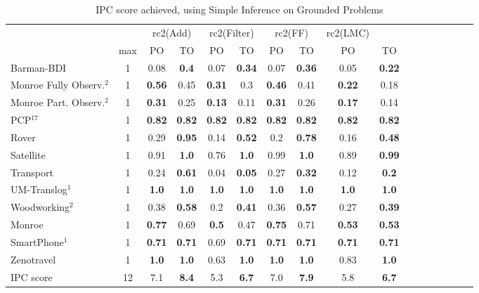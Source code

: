 \documentclass[letterpaper]{article} %
\begin{document}
\begin{table}
	\centering
	\caption{IPC score achieved, using Simple Inference on Grounded Problems}
	\label{table:GroundedSimpleIPC}
	\scalebox{0.85} {
		\begin{tabular}{lccccccccccccccccl} 
			\toprule 
			&& \multicolumn{2}{c}{rc2(Add)} & \multicolumn{2}{c}{rc2(Filter)} & \multicolumn{2}{c}{rc2(FF)} & \multicolumn{2}{c}{rc2(LMC)} \\ 
			\cmidrule(lr){3-4} \cmidrule(lr){5-6} \cmidrule(lr){7-8} \cmidrule(lr){9-10}  
			& max &PO & TO & PO & TO & PO & TO & PO &\multicolumn{2}{c}{ TO  } \\ 
			\midrule 
			Barman-BDI & 1 & 0.08 & \textbf{0.4} & 0.07 & \textbf{0.34} & 0.07 & \textbf{0.36} & 0.05 &\multicolumn{2}{c}{ \textbf{0.22}  } \\ 
			Monroe Fully Observ.$^{2}$ & 1 & \textbf{0.56} & 0.45 & \textbf{0.31} & 0.3 & \textbf{0.46} & 0.41 & \textbf{0.22} &\multicolumn{2}{c}{ 0.18  } \\ 
			Monroe Part. Observ.$^{2}$ & 1 & \textbf{0.31} & 0.25 & \textbf{0.13} & 0.11 & \textbf{0.31} & 0.26 & \textbf{0.17} &\multicolumn{2}{c}{ 0.14  } \\ 
			PCP$^{17}$ & 1 & \textbf{0.82} & \textbf{0.82} & \textbf{0.82} & \textbf{0.82} & \textbf{0.82} & \textbf{0.82} & \textbf{0.82} &\multicolumn{2}{c}{ \textbf{0.82}  } \\ 
			Rover & 1 & 0.29 & \textbf{0.95} & 0.14 & \textbf{0.52} & 0.2 & \textbf{0.78} & 0.16 &\multicolumn{2}{c}{ \textbf{0.48}  } \\ 
			Satellite & 1 & 0.91 & \textbf{1.0} & 0.76 & \textbf{1.0} & 0.99 & \textbf{1.0} & 0.89 &\multicolumn{2}{c}{ \textbf{0.99}  } \\ 
			Transport & 1 & 0.24 & \textbf{0.61} & 0.04 & \textbf{0.05} & 0.27 & \textbf{0.32} & 0.12 &\multicolumn{2}{c}{ \textbf{0.2}  } \\ 
			UM-Translog$^{1}$ & 1 & \textbf{1.0} & \textbf{1.0} & \textbf{1.0} & \textbf{1.0} & \textbf{1.0} & \textbf{1.0} & \textbf{1.0} &\multicolumn{2}{c}{ \textbf{1.0}  } \\ 
			Woodworking$^{2}$ & 1 & 0.38 & \textbf{0.58} & 0.2 & \textbf{0.41} & 0.36 & \textbf{0.57} & 0.27 &\multicolumn{2}{c}{ \textbf{0.39}  } \\ 
			\midrule 
			Monroe & 1 & \textbf{0.77} & 0.69 & \textbf{0.5} & 0.47 & \textbf{0.75} & 0.71 & \textbf{0.53} &\multicolumn{2}{c}{ \textbf{0.53}  } \\ 
			SmartPhone$^{1}$ & 1 & \textbf{0.71} & \textbf{0.71} & 0.69 & \textbf{0.71} & \textbf{0.71} & \textbf{0.71} & \textbf{0.71} &\multicolumn{2}{c}{ \textbf{0.71}  } \\ 
			Zenotravel & 1 & \textbf{1.0} & \textbf{1.0} & 0.63 & \textbf{1.0} & \textbf{1.0} & \textbf{1.0} & 0.83 &\multicolumn{2}{c}{ \textbf{1.0}  } \\ 
			\midrule 
			IPC score & 12 & 7.1 & \textbf{8.4} & 5.3 & \textbf{6.7} & 7.0 & \textbf{7.9} & 5.8 &\multicolumn{2}{c}{ \textbf{6.7}  } \\
			\bottomrule 
		\end{tabular} 
	}
\end{table}
\end{document}

